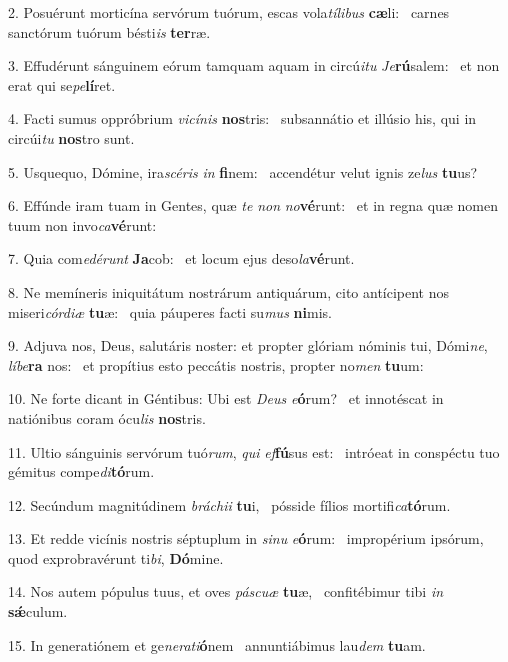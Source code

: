 2. Posuérunt morticína servórum tuórum, escas vola\textit{tí}\textit{li}\textit{bus} \textbf{cæ}li: \ast\  carnes sanctórum tuórum bésti\textit{is} \textbf{ter}ræ.\

3. Effudérunt sánguinem eórum tamquam aquam in circú\textit{i}\textit{tu} \textit{Je}\textbf{rú}salem: \ast\  et non erat qui se\textit{pe}\textbf{lí}ret.\

4. Facti sumus oppróbrium \textit{vi}\textit{cí}\textit{nis} \textbf{nos}tris: \ast\  subsannátio et illúsio his, qui in circúi\textit{tu} \textbf{nos}tro sunt.\

5. Usquequo, Dómine, ira\textit{scé}\textit{ris} \textit{in} \textbf{fi}nem: \ast\  accendétur velut ignis ze\textit{lus} \textbf{tu}us?\

6. Effúnde iram tuam in Gentes, quæ \textit{te} \textit{non} \textit{no}\textbf{vé}runt: \ast\  et in regna quæ nomen tuum non invo\textit{ca}\textbf{vé}runt:\

7. Quia com\textit{e}\textit{dé}\textit{runt} \textbf{Ja}cob: \ast\  et locum ejus deso\textit{la}\textbf{vé}runt.\

8. Ne memíneris iniquitátum nostrárum antiquárum, cito antícipent nos miseri\textit{cór}\textit{di}\textit{æ} \textbf{tu}æ: \ast\  quia páuperes facti su\textit{mus} \textbf{ni}mis.\

9. Adjuva nos, Deus, salutáris noster: et propter glóriam nóminis tui, Dómi\textit{ne}, \textit{lí}\textit{be}\textbf{ra} nos: \ast\  et propítius esto peccátis nostris, propter no\textit{men} \textbf{tu}um:\

10. Ne forte dicant in Géntibus: Ubi est \textit{De}\textit{us} \textit{e}\textbf{ó}rum? \ast\  et innotéscat in natiónibus coram ócu\textit{lis} \textbf{nos}tris.\

11. Ultio sánguinis servórum tuó\textit{rum}, \textit{qui} \textit{ef}\textbf{fú}sus est: \ast\  intróeat in conspéctu tuo gémitus compe\textit{di}\textbf{tó}rum.\

12. Secúndum magnitúdinem \textit{brá}\textit{chi}\textit{i} \textbf{tu}i, \ast\  pósside fílios mortifi\textit{ca}\textbf{tó}rum.\

13. Et redde vicínis nostris séptuplum in \textit{si}\textit{nu} \textit{e}\textbf{ó}rum: \ast\  impropérium ipsórum, quod exprobravérunt ti\textit{bi}, \textbf{Dó}mine.\

14. Nos autem pópulus tuus, et oves \textit{pás}\textit{cu}\textit{æ} \textbf{tu}æ, \ast\  confitébimur tibi \textit{in} \textbf{sǽ}culum.\

15. In generatiónem et ge\textit{ne}\textit{ra}\textit{ti}\textbf{ó}nem \ast\  annuntiábimus lau\textit{dem} \textbf{tu}am.\

